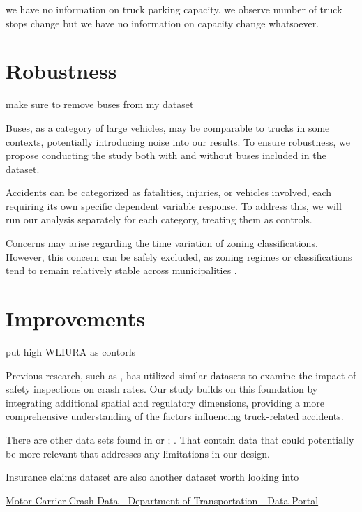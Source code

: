\documentclass[
  12pt]{article}
\begin{document}
we have no information on truck parking capacity. we observe number of
truck stops change but we have no information on capacity change
whatsoever.

\section{\texorpdfstring{\textbf{Robustness}}{Robustness}}\label{robustness}

make sure to remove buses from my dataset

Buses, as a category of large vehicles, may be comparable to trucks in
some contexts, potentially introducing noise into our results. To ensure
robustness, we propose conducting the study both with and without buses
included in the dataset.

Accidents can be categorized as fatalities, injuries, or vehicles
involved, each requiring its own specific dependent variable response.
To address this, we will run our analysis separately for each category,
treating them as controls.

Concerns may arise regarding the time variation of zoning
classifications. However, this concern can be safely excluded, as zoning
regimes or classifications tend to remain relatively stable across
municipalities \citep{mclaughlinLandUseRegulation2012}.

\section{\texorpdfstring{\textbf{Improvements}}{Improvements}}\label{improvements}

put high WLIURA as contorls

Previous research, such as \citet{liangSafetyInspectionsImprove2021},
has utilized similar datasets to examine the impact of safety
inspections on crash rates. Our study builds on this foundation by
integrating additional spatial and regulatory dimensions, providing a
more comprehensive understanding of the factors influencing
truck-related accidents.

There are other data sets found in \citep{NHTSAFileDownloads} or
\citep{FatalityAnalysisReporting} ; . That contain data that could
potentially be more relevant that addresses any limitations in our
design.

Insurance claims dataset are also another dataset worth looking into

\href{https://data.transportation.gov/Trucking-and-Motorcoaches/Motor-Carrier-Crash-Data-/b8e5-isfj/about_data}{Motor
Carrier Crash Data - \textbar{} Department of Transportation - Data
Portal}
\end{document}
